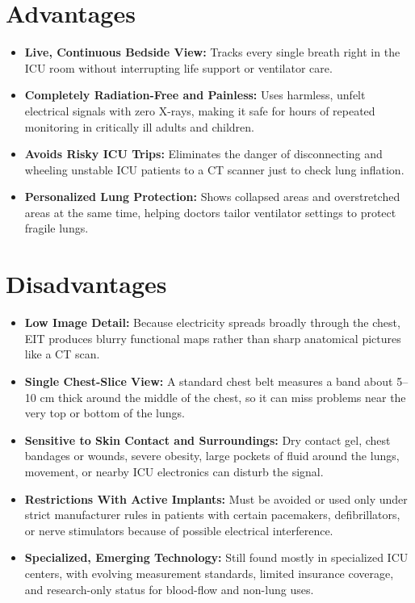 \section{Advantages}
\begin{itemize}
    \item \textbf{Live, Continuous Bedside View:} Tracks every single breath right in the ICU room without interrupting life support or ventilator care.
    \item \textbf{Completely Radiation-Free and Painless:} Uses harmless, unfelt electrical signals with zero X-rays, making it safe for hours of repeated monitoring in critically ill adults and children.
    \item \textbf{Avoids Risky ICU Trips:} Eliminates the danger of disconnecting and wheeling unstable ICU patients to a CT scanner just to check lung inflation.
    \item \textbf{Personalized Lung Protection:} Shows collapsed areas and overstretched areas at the same time, helping doctors tailor ventilator settings to protect fragile lungs.
\end{itemize}

\section{Disadvantages}
\begin{itemize}
    \item \textbf{Low Image Detail:} Because electricity spreads broadly through the chest, EIT produces blurry functional maps rather than sharp anatomical pictures like a CT scan.
    \item \textbf{Single Chest-Slice View:} A standard chest belt measures a band about 5--10 cm thick around the middle of the chest, so it can miss problems near the very top or bottom of the lungs.
    \item \textbf{Sensitive to Skin Contact and Surroundings:} Dry contact gel, chest bandages or wounds, severe obesity, large pockets of fluid around the lungs, movement, or nearby ICU electronics can disturb the signal.
    \item \textbf{Restrictions With Active Implants:} Must be avoided or used only under strict manufacturer rules in patients with certain pacemakers, defibrillators, or nerve stimulators because of possible electrical interference.
    \item \textbf{Specialized, Emerging Technology:} Still found mostly in specialized ICU centers, with evolving measurement standards, limited insurance coverage, and research-only status for blood-flow and non-lung uses.
\end{itemize}

